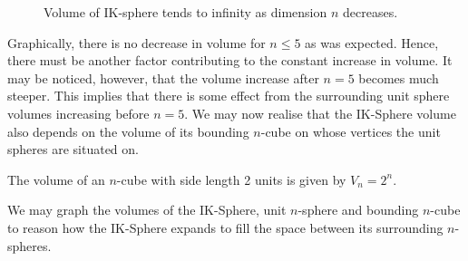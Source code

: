 \begin{figure}[H]
    \centering
    \caption{Volume of IK-sphere tends to infinity as dimension $n$ decreases.}
    \label{fig:IK sphere volume to infinity graph}
\end{figure}

Graphically, there is no decrease in volume for $n \leq 5$ as was expected. Hence, there must be another factor contributing to the constant increase in volume. It may be noticed, however, that the volume increase after $n=5$ becomes much steeper. This implies that there is some effect from the surrounding unit sphere volumes increasing before $n=5$. We may now realise that the IK-Sphere volume also depends on the volume of its bounding $n$-cube on whose vertices the unit spheres are situated on. 

The volume of an $n$-cube with side length 2 units is given by $V_n = 2^n$.

We may graph the volumes of the IK-Sphere, unit $n$-sphere and bounding $n$-cube to reason how the IK-Sphere expands to fill the space between its surrounding $n$-spheres.
